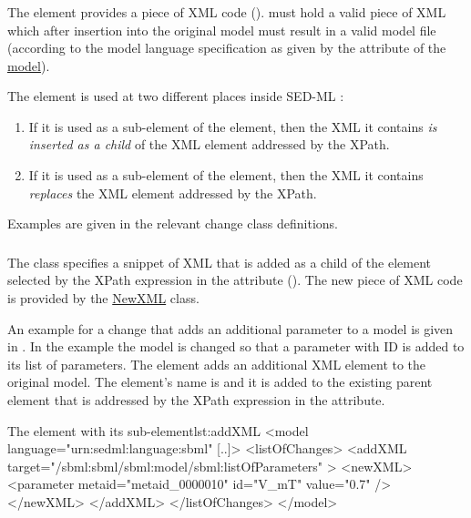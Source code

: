 \subsubsection{}
\label{sec:newXml}
The  element provides a piece of XML code ().  must hold a valid piece of XML which after insertion into the original model must result in a valid model file (according to the model language specification as given by the \hyperref[sec:language]{} attribute of the \hyperref[class:model]{model}).

The  element is used at two different places inside SED-ML \currentLV:

\begin{enumerate}
	\item{If it is used as a sub-element of the \hyperref[class:addXml]{} element, then the XML it contains \emph{is inserted as a child} of the XML element addressed by the XPath.}
	\item{If it is used as a sub-element of the \hyperref[class:changeXml]{} element, then the XML it contains \emph{replaces} the XML element addressed by the XPath.}
\end{enumerate}

Examples are given in the relevant change class definitions.


\subsubsection{}
\label{class:addXml}
The  class specifies a snippet of XML that is added as a child of the element selected by the XPath expression in the \hyperref[sec:changeTarget]{} attribute (). The new piece of XML code is provided by the \hyperref[sec:newXml]{NewXML} class.

An example for a change that adds an additional parameter to a model is given in . In the example the model is changed so that a parameter with ID  is added to its list of parameters. The  element adds an additional XML element to the original model. The element's name is  and it is added to the existing parent element  that is addressed by the XPath expression in the  attribute.

\begin{myXmlLst}{The  element with its  sub-element}{lst:addXML}
<model language="urn:sedml:language:sbml" [..]>
	<listOfChanges>
		<addXML target="/sbml:sbml/sbml:model/sbml:listOfParameters" >
			<newXML>
				<parameter metaid="metaid_0000010" id="V_mT" value="0.7" />
			</newXML>
		</addXML>
	</listOfChanges>
</model>
\end{myXmlLst}


